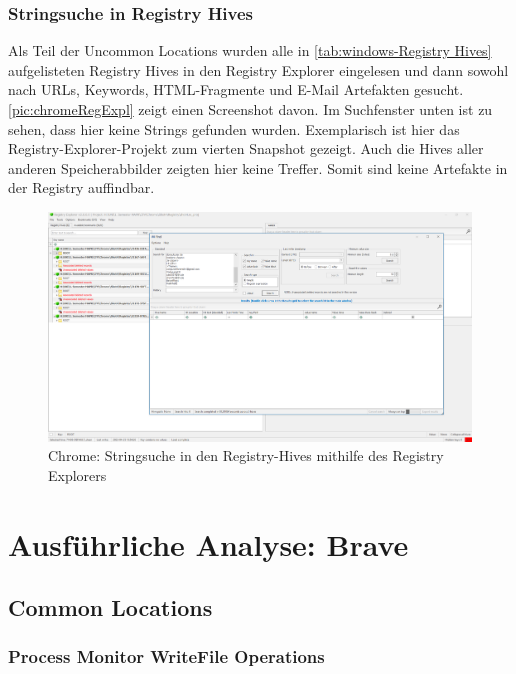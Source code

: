 \begin{appendices}
\subsubsection*{Stringsuche in Registry Hives}\label{chap:anhang-chrome-uncommon-registry}
Als Teil der Uncommon Locations wurden alle in \autoref{tab:windows-Registry Hives} aufgelisteten Registry Hives in den Registry Explorer eingelesen und dann sowohl nach URLs, Keywords, HTML-Fragmente und E-Mail Artefakten gesucht. \autoref{pic:chromeRegExpl} zeigt einen Screenshot davon. Im Suchfenster unten ist zu sehen, dass hier keine Strings gefunden wurden. Exemplarisch ist hier das Registry-Explorer-Projekt zum vierten Snapshot gezeigt. Auch die Hives aller anderen Speicherabbilder zeigten hier keine Treffer. Somit sind keine Artefakte in der Registry auffindbar.
\begin{figure}[h!]
	\centering
	\includegraphics[width=\textwidth]{bilder/RegExpl.png}
	\caption{Chrome: Stringsuche in den Registry-Hives mithilfe des Registry Explorers}
	\label{pic:chromeRegExpl}
\end{figure}



\pagebreak

\section{Ausführliche Analyse: Brave}\label{chap:anhang-brave}
\subsection{Common Locations}\label{chap:anhang-brave-common-locations}
\subsubsection*{Process Monitor WriteFile Operations}\label{chap:anhang-brave-common-locations-writefile-operations}


\end{appendices}
